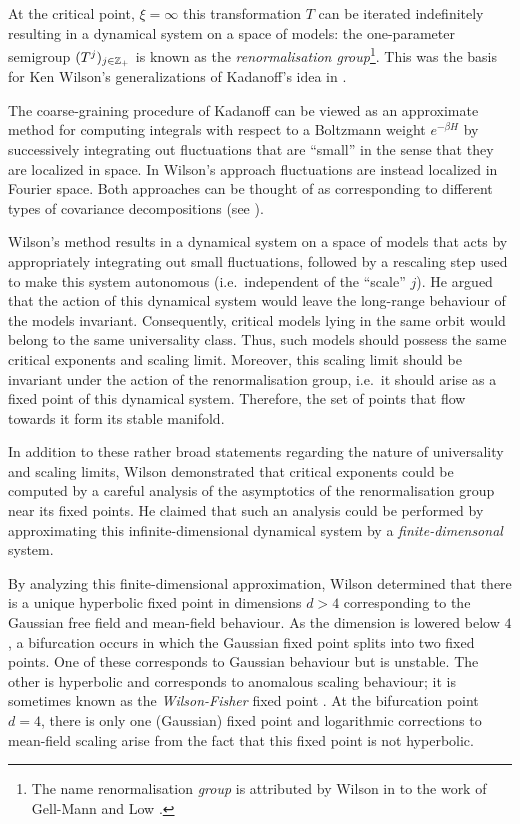 At the critical point, $\xi = \infty$ this transformation
$T$ can be iterated indefinitely resulting in a dynamical system on a space
of models: the one-parameter semigroup $(T^j)_{j\in{\mathbb Z}_+}$ is known as the
\emph{renormalisation group}\footnote{The name
renormalisation \emph{group} is attributed by Wilson in \cite{Wils71I}
to the work of Gell-Mann and Low \cite{GML54}.}. This was the basis for Ken Wilson's
generalizations of Kadanoff's idea in \cite{Wils71I,Wils71II}.

The coarse-graining procedure of Kadanoff can be viewed as an approximate
method for computing integrals with respect to a Boltzmann weight $e^{-\beta H}$
by successively integrating out fluctuations that are ``small'' in the sense
that they are localized in space. In Wilson's approach fluctuations are instead
localized in Fourier space. Both approaches can be thought of
as corresponding to different types of covariance decompositions (see \cite{BCGNOPS78}).

Wilson's method results in a dynamical system on a space of
models that acts by appropriately integrating out small fluctuations, followed
by a rescaling step used to make this system autonomous (i.e.\ independent of
the ``scale'' $j$). He argued that the action of this dynamical system would
leave the long-range behaviour of the models invariant. Consequently, critical models
lying in the same orbit would belong to
the same universality class. Thus, such models should possess the same critical
exponents and scaling limit. Moreover, this scaling limit should be invariant
under the action of the renormalisation group, i.e.\ it should arise as a fixed
point of this dynamical system. Therefore, the set of points that flow towards it
form its stable manifold.

In addition to these rather broad statements regarding the nature of universality
and scaling limits, Wilson demonstrated that critical exponents could be computed
by a careful analysis of the asymptotics of the renormalisation group near its
fixed points. He claimed that such an analysis could be performed by approximating
this infinite-dimensional dynamical system by a \emph{finite-dimensonal} system.

By analyzing this finite-dimensional approximation, Wilson determined that there
is a unique hyperbolic fixed point in dimensions $d > 4$ corresponding to the Gaussian
free field and mean-field behaviour. As the dimension is lowered below $4$, a
bifurcation occurs in which the Gaussian fixed point splits into two fixed points.
One of these corresponds to Gaussian behaviour but is unstable. The other is hyperbolic and
corresponds to anomalous scaling behaviour; it is sometimes known as the
\emph{Wilson-Fisher} fixed point \cite{WF72}. At the bifurcation point $d = 4$, there is only
one (Gaussian) fixed point and logarithmic corrections to mean-field scaling arise
from the fact that this fixed point is not hyperbolic.

